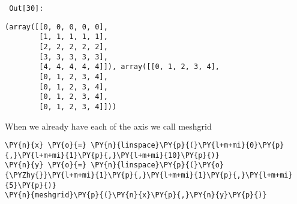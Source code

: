        {\par%
        \vspace{-1\smallerfontscale}%
        \noindent%
        \begin{minipage}{\cellleftmargin}%
    \hfill%
    {\smaller%
    \tt%
    \color{nbframe-out-prompt}%
    Out[30]:}%
    \hspace{\inputpadding}%
    \hspace{0em}%
    \hspace{3pt}%
    \end{minipage}%
        }%
    \begin{addmargin}[\cellleftmargin]{0em}%
    {\smaller%
    \vspace{-1\smallerfontscale}%
    
    
    
    \begin{verbatim}
(array([[0, 0, 0, 0, 0],
        [1, 1, 1, 1, 1],
        [2, 2, 2, 2, 2],
        [3, 3, 3, 3, 3],
        [4, 4, 4, 4, 4]]), array([[0, 1, 2, 3, 4],
        [0, 1, 2, 3, 4],
        [0, 1, 2, 3, 4],
        [0, 1, 2, 3, 4],
        [0, 1, 2, 3, 4]]))
    \end{verbatim}

    
}%
    \end{addmargin}%
    When we already have each of the axis we call meshgrid


{\par%
\vspace{-1\baselineskip}%
}%
\begin{notebookcell}[31]%
\begin{addmargin}[\cellleftmargin]{0em}%
{\smaller%
\par%
%
\vspace{-1\smallerfontscale}%
\begin{Verbatim}[commandchars=\\\{\}]
\PY{n}{x} \PY{o}{=} \PY{n}{linspace}\PY{p}{(}\PY{l+m+mi}{0}\PY{p}{,}\PY{l+m+mi}{1}\PY{p}{,}\PY{l+m+mi}{10}\PY{p}{)}
\PY{n}{y} \PY{o}{=} \PY{n}{linspace}\PY{p}{(}\PY{o}{\PYZhy{}}\PY{l+m+mi}{1}\PY{p}{,}\PY{l+m+mi}{1}\PY{p}{,}\PY{l+m+mi}{5}\PY{p}{)}
\PY{n}{meshgrid}\PY{p}{(}\PY{n}{x}\PY{p}{,}\PY{n}{y}\PY{p}{)}
\end{Verbatim}
%
\par%
\vspace{-1\smallerfontscale}}%
\end{addmargin}
\end{notebookcell}

